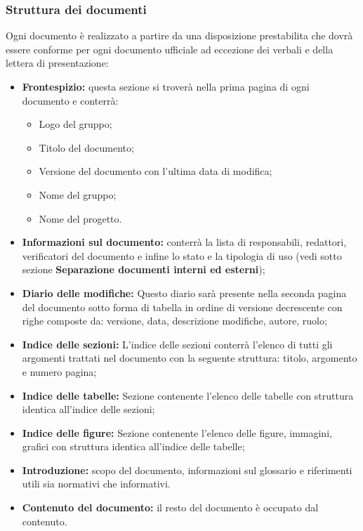 \documentclass[NormeDiProgetto.tex]{subfiles}
\begin{document}
	\subsubsection{Struttura dei documenti}
		Ogni documento è realizzato a partire da una disposizione prestabilita che dovrà essere conforme per ogni documento ufficiale ad eccezione dei verbali e della lettera di presentazione:
		\begin{itemize}
			\item \textbf{Frontespizio:} questa sezione si troverà nella prima pagina di ogni documento e conterrà:
			\begin{itemize}
				\item Logo del gruppo;
				\item Titolo del documento;
				\item Versione del documento con l'ultima data di modifica;
				\item Nome del gruppo;
				\item Nome del progetto.
			\end{itemize}
			
			\item \textbf{Informazioni sul documento:} conterrà la lista di responsabili,
			redattori, verificatori del documento e infine lo stato e la tipologia di uso (vedi sotto sezione \textbf{Separazione documenti interni ed esterni});
			
			\item \textbf{Diario delle modifiche:}
			Questo diario sarà presente nella seconda pagina del documento sotto forma di tabella in ordine di versione decrescente con righe composte da: versione, data, descrizione modifiche, autore, ruolo;
			
			\item \textbf{Indice delle sezioni:}
			L'indice delle sezioni conterrà l'elenco di tutti gli argomenti trattati nel documento con la seguente struttura: titolo, argomento e numero pagina;
			
			\item \textbf{Indice delle tabelle:}
			Sezione contenente l'elenco delle tabelle con struttura identica all'indice delle sezioni;
			
			\item \textbf{Indice delle figure:}
			Sezione contenente l'elenco delle figure, immagini, grafici con struttura identica all'indice delle tabelle;
			
			\item \textbf{Introduzione:}
			scopo del documento, informazioni sul glossario e riferimenti utili sia normativi che informativi.
			 
			\item \textbf{Contenuto del documento:} il resto del documento è occupato dal contenuto.
			
			
		\end{itemize}
		
\end{document}
